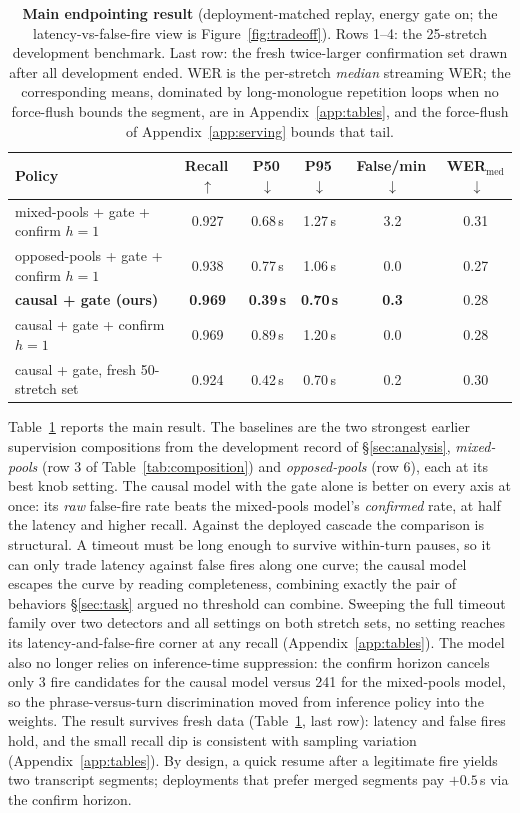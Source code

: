 \documentclass[11pt]{article}
\begin{document}
\begin{table}[t]
  \centering\small
  \caption{\textbf{Main endpointing result} (deployment-matched replay, energy gate on; the latency-vs-false-fire view is Figure~\ref{fig:tradeoff}). Rows 1--4: the 25-stretch development benchmark. Last row: the fresh twice-larger confirmation set drawn after all development ended. WER is the per-stretch \emph{median} streaming WER; the corresponding means, dominated by long-monologue repetition loops when no force-flush bounds the segment, are in Appendix~\ref{app:tables}, and the force-flush of Appendix~\ref{app:serving} bounds that tail.}
  \label{tab:main}
  \begin{tabular}{lccccc}
    \toprule
    Policy & Recall\,$\uparrow$ & P50\,$\downarrow$ & P95\,$\downarrow$ & False/min\,$\downarrow$ & WER$_\text{med}$\,$\downarrow$ \\
    \midrule
    mixed-pools + gate + confirm $h{=}1$ & 0.927 & 0.68\,s & 1.27\,s & 3.2 & 0.31 \\
    opposed-pools + gate + confirm $h{=}1$ & 0.938 & 0.77\,s & 1.06\,s & 0.0 & 0.27 \\
    \textbf{causal + gate (ours)} & \textbf{0.969} & \textbf{0.39\,s} & \textbf{0.70\,s} & \textbf{0.3} & 0.28 \\
    causal + gate + confirm $h{=}1$ & 0.969 & 0.89\,s & 1.20\,s & 0.0 & 0.28 \\
    causal + gate, fresh 50-stretch set & 0.924 & 0.42\,s & 0.70\,s & 0.2 & 0.30 \\
    \bottomrule
  \end{tabular}
\end{table}

Table~\ref{tab:main} reports the main result. The baselines are the two strongest earlier supervision compositions from the development record of \S\ref{sec:analysis}, \emph{mixed-pools} (row 3 of Table~\ref{tab:composition}) and \emph{opposed-pools} (row 6), each at its best knob setting. The causal model with the gate alone is better on every axis at once: its \emph{raw} false-fire rate beats the mixed-pools model's \emph{confirmed} rate, at half the latency and higher recall. Against the deployed cascade the comparison is structural. A timeout must be long enough to survive within-turn pauses, so it can only trade latency against false fires along one curve; the causal model escapes the curve by reading completeness, combining exactly the pair of behaviors \S\ref{sec:task} argued no threshold can combine. Sweeping the full timeout family over two detectors and all settings on both stretch sets, no setting reaches its latency-and-false-fire corner at any recall (Appendix~\ref{app:tables}). The model also no longer relies on inference-time suppression: the confirm horizon cancels only 3 fire candidates for the causal model versus 241 for the mixed-pools model, so the phrase-versus-turn discrimination moved from inference policy into the weights. The result survives fresh data (Table~\ref{tab:main}, last row): latency and false fires hold, and the small recall dip is consistent with sampling variation (Appendix~\ref{app:tables}). By design, a quick resume after a legitimate fire yields two transcript segments; deployments that prefer merged segments pay $+0.5$\,s via the confirm horizon.
\end{document}
